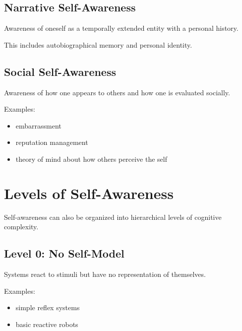 \documentclass{article}
\begin{document}
        \subsection{Narrative Self-Awareness}
            
            Awareness of oneself as a temporally extended entity with a personal history.
            
            This includes autobiographical memory and personal identity.
        
        \subsection{Social Self-Awareness}
            
            Awareness of how one appears to others and how one is evaluated socially.
            
            Examples:
            
            \begin{itemize}
                \item embarrassment
                \item reputation management
                \item theory of mind about how others perceive the self
            \end{itemize}
    
    
    \section{Levels of Self-Awareness}
        
        Self-awareness can also be organized into hierarchical levels of cognitive complexity.
        
        \subsection{Level 0: No Self-Model}
            
            Systems react to stimuli but have no representation of themselves.
            
            Examples:
            
            \begin{itemize}
                \item simple reflex systems
                \item basic reactive robots
            \end{itemize}
        
\end{document}

